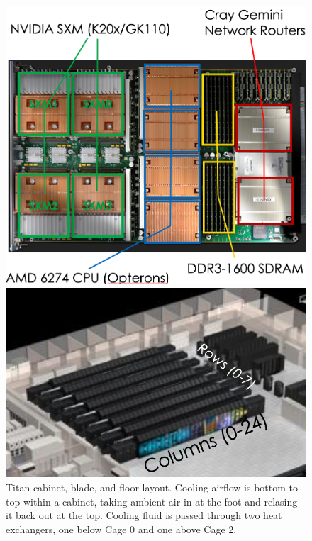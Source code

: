 \begin{figure}
\begin{minipage}{0.49\columnwidth}
    \includegraphics[width=\columnwidth]{figs/TitanBlade.png}
    
    \vspace{5em}
    \includegraphics[width=\columnwidth]{figs/TitanLayout.png}
  \end{minipage}
  \caption{Titan cabinet, blade, and floor layout. Cooling airflow is
    bottom to top within a cabinet, taking ambient air in at the foot
    and relasing it back out at the top. Cooling fluid is passed
    through two heat exchangers, one below Cage 0 and one above Cage
    2.}
  \label{fig:layout}
\end{figure}

